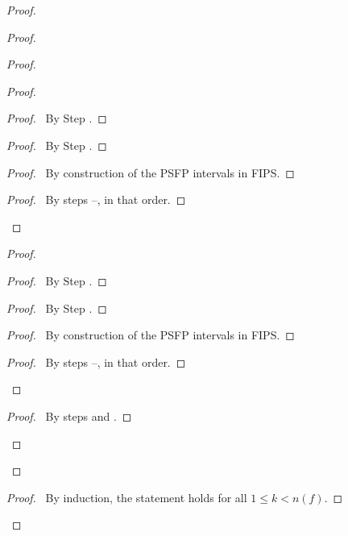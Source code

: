 \begin{proof}
\begin{proof}
\begin{proof}
	\begin{proof}
	  \begin{proof}
	    \pf\ By Step .
	  \end{proof}
	  \begin{proof}
	    \pf\ By Step .
	  \end{proof}
	  \begin{proof}
	    \pf\ By construction of the PSFP intervals in FIPS.
	  \end{proof}
	  \qedstep
	  \begin{proof}
	    \pf\ By steps --, in that order.
	  \end{proof}
	\end{proof}
	\begin{proof}
	  \begin{proof}
	    \pf\ By Step .
	  \end{proof}
	  \begin{proof}
	    \pf\ By Step .
	  \end{proof}

	  \begin{proof}
	    \pf\ By construction of the PSFP intervals in FIPS.
	  \end{proof}
	  \qedstep
	  \begin{proof}
	    \pf\ By steps --, in that order.
	  \end{proof}
	\end{proof}
	\qedstep
	\begin{proof}
	  \pf\ By steps  and .
	\end{proof}
      \end{proof}
    \end{proof}
    \qedstep
    \begin{proof}
      \pf\ By induction, the statement holds for all $1 \leq k < n(f)$.
    \end{proof}
\end{proof}
